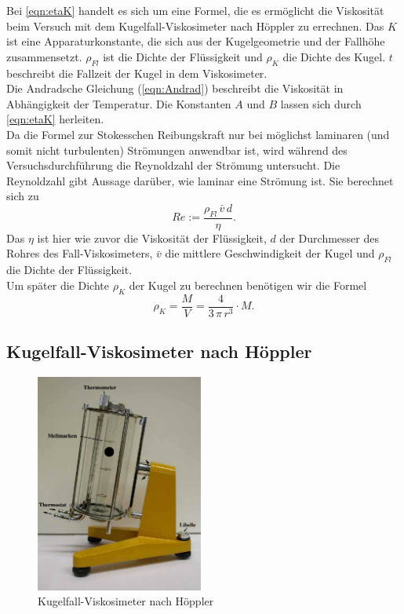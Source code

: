     Bei \autoref{eqn:etaK} handelt es sich um eine Formel, die es ermöglicht die Viskosität beim Versuch mit dem Kugelfall-Viskosimeter nach Höppler zu errechnen.
    Das $K$ ist eine Apparaturkonstante, die sich aus der Kugelgeometrie und der Fallhöhe zusammensetzt. $\rho_{Fl}$ ist die Dichte der Flüssigkeit und $\rho_K$ die Dichte
    des Kugel. $t$ beschreibt die Fallzeit der Kugel in dem Viskosimeter.\\
    Die Andradsche Gleichung (\ref{eqn:Andrad}) beschreibt die Viskosität in Abhängigkeit der Temperatur. Die Konstanten $A$ und $B$ lassen sich durch \autoref{eqn:etaK}
    herleiten.\\
    Da die Formel zur Stokesschen Reibungskraft nur bei möglichst laminaren (und somit nicht turbulenten) Strömungen anwendbar ist, wird während des Versuchsdurchführung die
    Reynoldzahl der Strömung untersucht. Die Reynoldzahl gibt Aussage darüber, wie laminar eine Strömung ist. Sie berechnet sich zu
    \begin{equation}
        \label{eqn:Reynoldzahl}
        Re := \frac{\rho_{Fl}\,\bar{v}\,d}{\eta}.
    \end{equation}
    Das $\eta$ ist hier wie zuvor die Viskosität der Flüssigkeit, $d$ der Durchmesser des Rohres des Fall-Viskosimeters, $\bar{v}$ die mittlere Geschwindigkeit der Kugel und
    $\rho_{Fl}$ die Dichte der Flüssigkeit.\\
    Um später die Dichte $\rho_K$ der Kugel zu berechnen benötigen wir die Formel
    \begin{equation}
        \label{eqn:KugelDichte}
        \rho_K = \frac{M}{V} = \frac{4}{3 \,\pi \, r^3} \cdot M.
    \end{equation}
\newpage
\subsection{Kugelfall-Viskosimeter nach Höppler}

\begin{figure}
    \centering
    \includegraphics[width=5.5cm]{Kugelfall.png}
    \caption{Kugelfall-Viskosimeter nach Höppler \cite{anleitung107}}
    \label{Abb:Kugelfall}
\end{figure}

